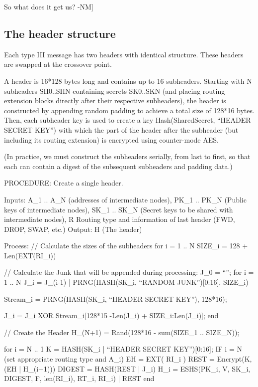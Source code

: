       So what does it get us?  -NM]  

\subsection{The header structure}

Each type III message has two headers with identical structure. These
headers are swapped at the crossover point.

A header is 16*128 bytes long and contains up to 16
subheaders. Starting with N subheaders SH0..SHN containing secrets
SK0..SKN (and placing routing extension blocks directly after their
respective subheaders), the header is constructed by appending 
random padding to achieve a total size
of 128*16 bytes. Then, each subheader key is used to create a key
Hash(SharedSecret, ``HEADER SECRET KEY'') with which the part of the
header after the subheader (but including its routing extension) is
encrypted using counter-mode AES.

(In practice, we must construct the subheaders serially, from last to
first, so that each can contain a digest of the subsequent subheaders
and padding data.) 

PROCEDURE: Create a single header.

Inputs: A_1 .. A_N (addresses of intermediate nodes), 
	PK_1 .. PK_N (Public keys of intermediate nodes),
	SK_1 .. SK_N (Secret keys to be shared with intermediate nodes),
        R Routing type and information of last header (FWD, DROP, SWAP, etc.)
Output: H (The header)

Process: 
  // Calculate the sizes of the subheaders
  for i = 1 .. N
	SIZE_i = 128 + Len(EXT(RI_i))

  // Calculate the Junk that will be appended during processing:
  J_0 = ``'';
  for i = 1 .. N
	J_i = J_(i-1) | PRNG(HASH(SK_i, ``RANDOM JUNK'')[0:16], SIZE_i)

        Stream_i = PRNG(HASH(SK_i, ``HEADER SECRET KEY''), 128*16);

	J_i = J_i XOR Stream_i[128*15 -Len(J_i) + SIZE_i:Len(J_i)];
  end

  // Create the Header
  H_(N+1) = Rand(128*16 - sum(SIZE_1 .. SIZE_N));

  for i = N .. 1
	K = HASH(SK_i | ``HEADER SECRET KEY'')[0:16];
	IF i = N (set appropriate routing type and A_i)
	EH = EXT( RI_i )
        REST = Encrypt(K, (EH | H_(i+1)))
  	DIGEST = HASH(REST | J_i)
	H_i = ESHS(PK_i, V, SK_i, DIGEST, F, len(RI_i), RT_i, RI_i) | REST
  end

